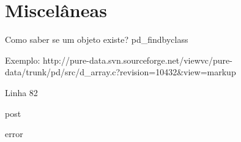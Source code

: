 
\chapter{Miscelâneas}
Como saber se um objeto existe?
pd\_findbyclass

Exemplo: http://pure-data.svn.sourceforge.net/viewvc/pure-data/trunk/pd/src/d\_array.c?revision=10432\&view=markup 

Linha 82


post

error

